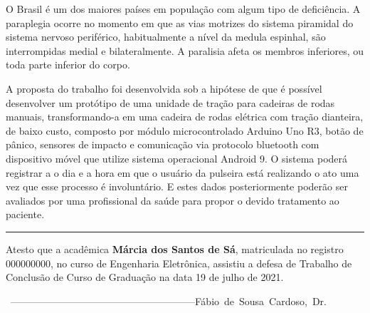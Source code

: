 \documentclass[12pt,a4paper]{article}
\begin{document}
	
		
	
		
	\onehalfspacing 
	{ O Brasil é um dos maiores países em população com algum tipo de deficiência. A paraplegia ocorre no momento em que as vias motrizes do sistema piramidal do sistema nervoso periférico, habitualmente a nível da medula espinhal, são interrompidas medial e bilateralmente. A paralisia afeta os membros inferiores, ou toda parte inferior do corpo.

A proposta do trabalho foi desenvolvida sob a hipótese de que é possível desenvolver um protótipo de uma unidade de tração para cadeiras de rodas manuais, transformando-a em uma cadeira de rodas elétrica com tração dianteira, de baixo custo, composto por módulo microcontrolado Arduino Uno R3, botão de pânico, sensores de impacto e comunicação via protocolo bluetooth com dispositivo móvel que utilize sistema operacional Android 9. O sistema poderá registrar a o dia e a hora em que o usuário da pulseira está realizando o ato uma vez que esse processo é involuntário. E estes dados posteriormente poderão ser avaliados por uma profissional da saúde para propor o devido tratamento ao paciente.
	}	
	
    
	
	\begin{center}
		\rule[0.5ex]{40em}{0.3ex}
	\end{center}
	
	Atesto que a acadêmica \textbf{Márcia dos Santos de Sá}, matriculada no registro 000000000, no curso de Engenharia  Eletrônica, assistiu a defesa de Trabalho de Conclusão
	de Curso de Graduação na data 19 de julho de 2021.	
	
	
	\vspace{0.9 cm}
	\begin{center}
		\hbox{
			\vbox{--------------------------------------------------------  \\ Fábio de Sousa Cardoso, Dr.} \hspace*{2cm} 		
		}
	\end{center}
	
	
\end{document}
